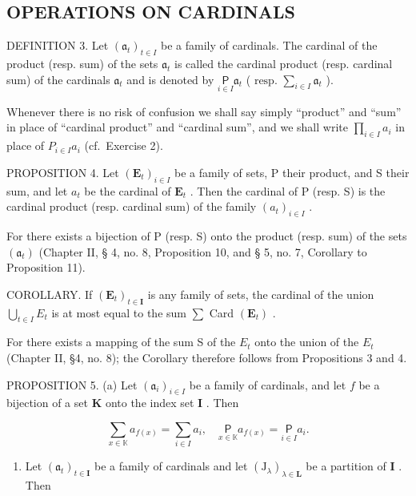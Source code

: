 \subsection{OPERATIONS ON CARDINALS}

DEFINITION 3. Let \((\mathfrak{a}_t)_{t \in I}\) be a family of cardinals. The cardinal of the product (resp. sum) of the sets \(\mathfrak{a}_t\) is called the cardinal product (resp. cardinal sum) of the cardinals \(\mathfrak{a}_t\) and is denoted by \(\underset{i \in I}{\mathsf{P}} \mathfrak{a}_t\) ( \(\text{resp. } \sum_{i \in I} \mathfrak{a}_t\) ).

Whenever there is no risk of confusion we shall say simply ``product'' and ``sum'' in place of ``cardinal product'' and ``cardinal sum'', and we shall write \(\prod_{i\in I}a_{i}\) in place of \(P_{i\in I}a_{i}\) (cf.~Exercise 2).

PROPOSITION 4. Let \((\mathbf{E}_t)_{i \in I}\) be a family of sets, P their product, and S their sum, and let \(a_t\) be the cardinal of \(\mathbf{E}_t\) . Then the cardinal of P (resp. S) is the cardinal product (resp. cardinal sum) of the family \((a_t)_{i \in I}\) .

For there exists a bijection of P (resp. S) onto the product (resp. sum) of the sets \((\mathfrak{a}_{t})\) (Chapter II, § 4, no. 8, Proposition 10, and § 5, no. 7, Corollary to Proposition 11).

COROLLARY. If \((\mathbf{E}_{t})_{t\in\mathbf{I}}\) is any family of sets, the cardinal of the union \(\bigcup_{t\in I}E_{t}\) is at most equal to the sum \(\sum\) Card \((\mathbf{E}_{t})\) .

For there exists a mapping of the sum S of the \(E_{t}\) onto the union of the \(E_{t}\) (Chapter II, §4, no. 8); the Corollary therefore follows from Propositions 3 and 4.

PROPOSITION 5. (a) Let \((\mathfrak{a}_i)_{i\in I}\) be a family of cardinals, and let \(f\) be a bijection of a set \(\mathbf{K}\) onto the index set \(\mathbf{I}\) . Then

\[
\sum_ {x \in \mathbb {K}} a _ {f (x)} = \sum_ {i \in I} a _ {i}, \quad \underset {x \in \mathbb {K}} {\mathsf {P}} a _ {f (x)} = \underset {i \in I} {\mathsf {P}} a _ {i}.
\]

\begin{enumerate}
\def\labelenumi{(\alph{enumi})}
\setcounter{enumi}{1}
\tightlist
\item
  Let \((\mathfrak{a}_t)_{t\in \mathbf{I}}\) be a family of cardinals and let \((\mathrm{J}_{\lambda})_{\lambda \in \mathbf{L}}\) be a partition of \(\mathbf{I}\) . Then
\end{enumerate}

